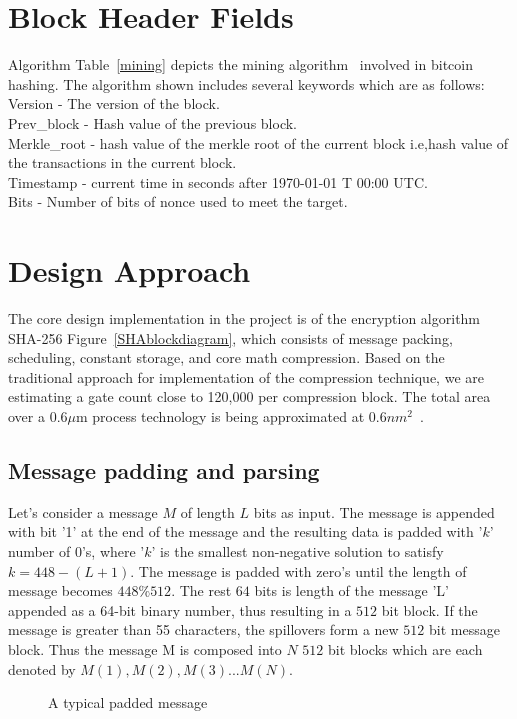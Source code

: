 \section{Block Header Fields}
Algorithm Table~\ref{mining} depicts the mining algorithm~\cite{FPGA} involved in bitcoin hashing.
The algorithm shown includes several keywords which are as follows: \\
Version - The version of the block. \\
Prev\_block - Hash value of the previous block. \\
Merkle\_root - hash value of the merkle root of the current block i.e,hash value of the transactions in the current block. \\
Timestamp - current time in seconds after 1970-01-01 T 00:00 UTC. \\
Bits - Number of bits of nonce used to meet the target.


\section{Design Approach}
The core design implementation in the project is of the encryption algorithm SHA-256  Figure~\ref{SHAblockdiagram}, which consists of message packing, scheduling, constant storage, and core math compression. Based on the traditional approach for implementation of the compression technique, we are estimating a gate count close to 120,000 per compression block. The total area over a $0.6\mu$m process technology is being approximated at $0.6nm^2$~\cite{area1,area2}. 


\subsection{Message padding and parsing}
Let's consider a message $M$ of length $L$ bits as input. The message is appended with bit '1' at the end of the message and the resulting data is padded with '$k$' number of 0's, where '$k$' is the smallest non-negative solution to satisfy $k=448-(L+1)$. The message is padded with zero's until the length of message becomes $448\%512$. The rest $64$ bits is length of the message 'L' appended as a 64-bit binary number, thus resulting in a $512$ bit block. If the message is greater than 55 characters, the spillovers form a new $512$ bit message block. Thus the message M is composed into $N$ $512$ bit blocks which are each denoted by $M(1), M(2), M(3) ... M(N)$. 

\begin{figure}[ht]
	\begin{center}
	\end{center}
	\vspace{-1ex}
	\caption{A typical padded message 
		\label{padded message}}
	\vspace{-4ex}
\end{figure}

